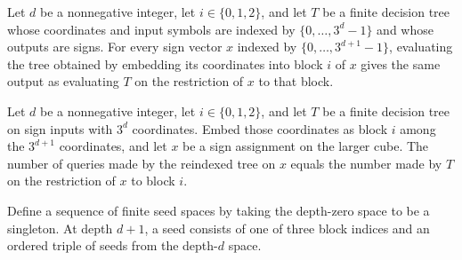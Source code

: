 \begin{theorem}
\label{FABL.eval_recursiveMajorityThreeTreeInBlock}
\leanok
{}
Let $d$ be a nonnegative integer, let $i\in\{0,1,2\}$, and let $T$ be a finite decision
tree whose coordinates and input symbols are indexed by $\{0,\ldots,3^d-1\}$ and whose
outputs are signs. For every sign vector $x$ indexed by $\{0,\ldots,3^{d+1}-1\}$,
evaluating the tree obtained by embedding its coordinates into block $i$ of $x$ gives
the same output as evaluating $T$ on the restriction of $x$ to that block.
\end{theorem}

\begin{theorem}
\label{FABL.queryCount_recursiveMajorityThreeTreeInBlock}
\leanok
{}
Let $d$ be a nonnegative integer, let $i\in\{0,1,2\}$, and let $T$ be a finite
decision tree on sign inputs with $3^d$ coordinates. Embed those coordinates as block
$i$ among the $3^{d+1}$ coordinates, and let $x$ be a sign assignment on the larger
cube. The number of queries made by the reindexed tree on $x$ equals the number made by
$T$ on the restriction of $x$ to block $i$.
\end{theorem}

\begin{definition}
\label{FABL.RecursiveMajorityThreeSeed}
\leanok
Define a sequence of finite seed spaces by taking the depth-zero space to be a
singleton. At depth $d+1$, a seed consists of one of three block indices and an ordered
triple of seeds from the depth-$d$ space.
\end{definition}

